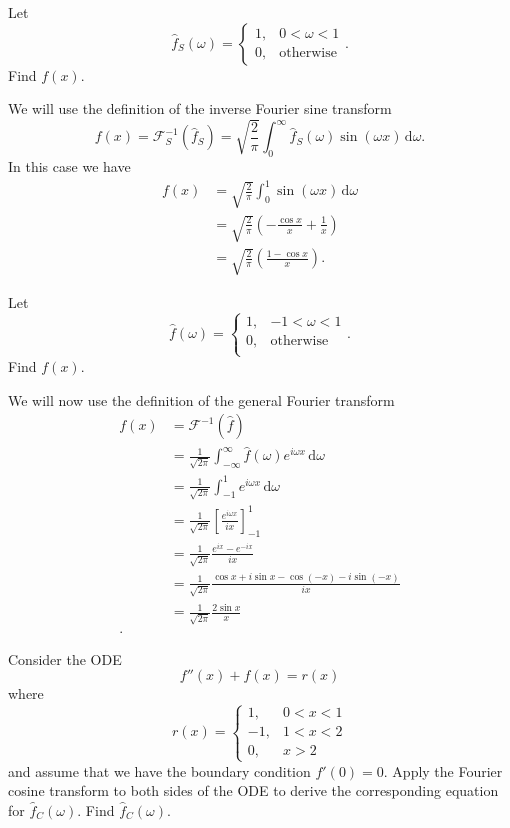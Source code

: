 Let
\[ 
\hat{f}_S \left( \omega \right) = \begin{cases}
1, & 0 < \omega < 1 \\
0, & \text{otherwise}
\end{cases}
.\]
Find $f(x)$.

\hr
We will use the definition of the inverse Fourier sine transform
\[ 
f(x) = \mathcal{F}_S^{-1} (\hat{f}_S) = \sqrt{\frac{2}{\pi}} \int_{0}^{\infty} \hat{f}_S (\omega) \sin (\omega x) \, \mathrm{d}\omega
.\]
In this case we have
\begin{align*}
  f(x) &= \sqrt{\frac{2}{\pi}} \int_{0}^{1} \sin (\omega x) \, \mathrm{d}\omega \\
  &= \sqrt{\frac{2}{\pi}} \left( - \frac{\cos x}{x} + \frac{1}{x} \right) \\
  &= \sqrt{\frac{2}{\pi}} \left( \frac{1 -\cos x}{x} \right)
.\end{align*}


Let
\[ 
\hat{f} \left( \omega \right) = \begin{cases}
1, & -1 < \omega < 1 \\
0, & \text{otherwise} \\
\end{cases}
.\]
Find $f(x)$.

\hr

We will now use the definition of the general Fourier transform
\begin{align*}
  f(x) &= \mathcal{F}^{-1}(\hat{f}) \\
  &= \frac{1}{\sqrt{2\pi}} \int_{-\infty}^{\infty} \hat{f}(\omega) e^{i\omega x} \, \mathrm{d}\omega \\
  &= \frac{1}{\sqrt{2\pi}} \int_{-1}^{1} e^{i \omega x} \, \mathrm{d}\omega \\
  &= \frac{1}{\sqrt{2\pi}} \left[ \frac{e^{i\omega x}}{ix} \right]_{-1}^{1} \\
  &= \frac{1}{\sqrt{2\pi}} \frac{e^{ix} - e^{-ix}}{ix} \\
  &= \frac{1}{\sqrt{2\pi}} \frac{\cos x + i \sin x - \cos (-x) - i \sin (-x)}{ix} \\
  &= \frac{1}{\sqrt{2\pi}} \frac{2 \sin x}{x} \\
.\end{align*}

Consider the ODE
\[ 
f''(x) + f(x) = r(x)
\]
where
\[ 
r(x) = \begin{cases}
1, & 0<x<1\\
-1, & 1<x<2 \\
0, & x > 2
\end{cases}
\]
and assume that we have the boundary condition $f'(0) = 0$.
Apply the Fourier cosine transform to both sides of the ODE to derive the corresponding equation for $\hat{f}_C (\omega)$.
Find $\hat{f}_C (\omega)$.

